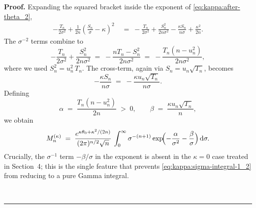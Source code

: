 \documentclass{article}%
\newenvironment{proof}[1][Proof]{\noindent\textbf{#1.} }{\ \rule{0.5em}{0.5em}}
\begin{document}
\begin{proof}
Expanding the squared bracket inside the exponent of
\eqref{eq:kappa:after-theta_2},
\begin{align*}
  -\frac{T_n}{2\sigma^2}
  + \frac{1}{2n}\!\left(\frac{S_n}{\sigma} - \kappa\right)^2
  &\;=\;
  -\frac{T_n}{2\sigma^2}
  + \frac{S_n^2}{2n\sigma^2}
  - \frac{\kappa S_n}{n \sigma}
  + \frac{\kappa^2}{2n}.
\end{align*}
The $\sigma^{-2}$ terms combine to
\[
  -\frac{T_n}{2\sigma^2} + \frac{S_n^2}{2n\sigma^2}
  \;=\;
  -\frac{nT_n - S_n^2}{2n\sigma^2}
  \;=\;
  -\frac{T_n(n - u_n^2)}{2n\sigma^2},
\]
where we used $S_n^2 = u_n^2\, T_n$.  The cross-term, again via
$S_n = u_n \sqrt{T_n}$, becomes
\[
  -\frac{\kappa S_n}{n\sigma}
  \;=\;
  -\frac{\kappa u_n \sqrt{T_n}}{n\sigma}.
\]
Defining
\begin{equation}
  \alpha \;=\; \frac{T_n(n - u_n^2)}{2n} \;>\; 0,
  \qquad
  \beta \;=\; \frac{\kappa u_n \sqrt{T_n}}{n},
  \label{eq:kappa:alpha-beta_2}
\end{equation}
we obtain
\begin{equation}
  M_n^{(\kappa)}
  \;=\;
  \frac{e^{\kappa \theta_0 + \kappa^2/(2n)}}{(2\pi)^{n/2}\sqrt n}\,
  \int_0^\infty \sigma^{-(n+1)}
  \exp\!\Bigl(-\frac{\alpha}{\sigma^2} - \frac{\beta}{\sigma}\Bigr)\,
  \mathrm{d}\sigma.
  \label{eq:kappa:sigma-integral-1_2}
\end{equation}
Crucially, the $\sigma^{-1}$ term $-\beta/\sigma$ in the exponent is
absent in the $\kappa = 0$ case treated in Section~4; this is the
single feature that prevents \eqref{eq:kappa:sigma-integral-1_2} from
reducing to a pure Gamma integral.



\end{proof}
\end{document}

